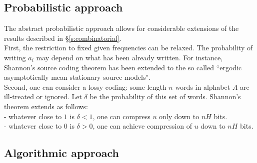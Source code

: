 \subsection{Probabilistic approach}
The abstract probabilistic approach allows for considerable
extensions of the results described in \S\ref{s:combinatorial}.
\medskip\\
First, the restriction to fixed given frequencies can be relaxed.
The probability of writing $a_i$ may depend on what has
been already written. For instance, Shannon's source coding theorem
has been extended to the so called
``ergodic asymptotically mean stationary source models".
\medskip\\
Second, one can consider a lossy coding: some length $n$ words in
alphabet $A$ are ill-treated or ignored.
Let $\delta$ be the probability of this set of words.
Shannon's theorem extends as follows:
\\- whatever close to $1$ is $\delta<1$,
one can compress $u$ only down to $nH$ bits.
\\- whatever close to $0$ is $\delta>0$,
one can achieve compression of $u$ down to $nH$ bits.
\subsection{Algorithmic approach}

